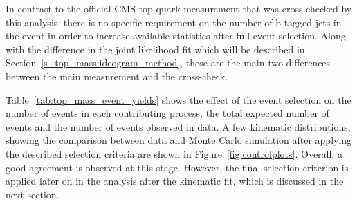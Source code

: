 \pagebreak[4]
In contrast to the official CMS top quark measurement \autocite{top_mass_ljets_CMS} that was cross-checked by this
analysis, there is no specific requirement on the number of b-tagged jets in the event in order to increase available
statistics after full event selection. Along with the difference in the joint likelihood fit which will be described in
Section~\ref{s_top_mass:ideogram_method}, these are the main two differences between the main measurement and the
cross-check.

Table~\ref{tab:top_mass_event_yields} shows the effect of the event selection on the number of events in each
contributing process, the total expected number of events and the number of events observed in data. A few kinematic
distributions, showing the comparison between data and Monte Carlo simulation after applying the described selection
criteria are shown in Figure~\ref{fig:controlplots}. Overall, a good agreement is observed at this stage. However, the
final selection criterion is applied later on in the analysis after the kinematic fit, which is discussed in the next
section.

\vspace{2cm}



